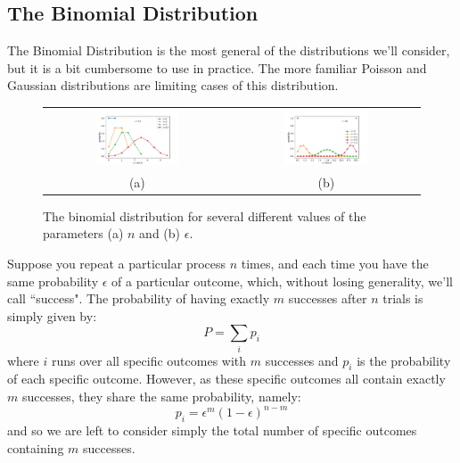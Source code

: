 \documentclass[12pt]{article}
\begin{document}
\subsection{The  Binomial Distribution}

The Binomial Distribution is the most general of the distributions we'll consider, but it is a bit cumbersome to use in practice.  The more familiar Poisson and Gaussian distributions are limiting cases of this distribution.  

\begin{figure}[htbp]
\begin{center}
\begin{tabular}{cc}
{\includegraphics[width=0.47\textwidth]{figs/chap_dist_binom_n.pdf}} &
{\includegraphics[width=0.47\textwidth]{figs/chap_dist_binom_eps.pdf}} \\
(a) & (b) \\
\end{tabular}
\end{center}
\caption{\label{fig:binom} The binomial distribution for several different values of the parameters (a) $n$ and (b) $\epsilon$.}
\end{figure}

Suppose you repeat a particular process $n$ times, and each time you have the same probability $\epsilon$ of a particular outcome, which, without losing generality, we'll call ``success".  The probability of having exactly $m$ successes after $n$ trials is simply given by:
\begin{displaymath}
P = \sum_i p_i
\end{displaymath}
where $i$ runs over all specific outcomes with $m$ successes and $p_i$ is the probability of each specific outcome.   However, as these specific outcomes all contain exactly $m$ successes, they share the same probability, namely:
\begin{displaymath}
p_i = \epsilon^m (1 - \epsilon)^{n-m}
\end{displaymath}
and so we are left to consider simply the total number of specific outcomes containing $m$ successes.  
\end{document}
